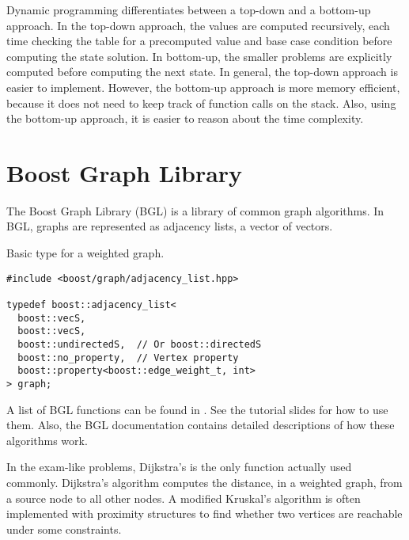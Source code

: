 \documentclass[justified,nobib]{tufte-handout}
\begin{document}

Dynamic programming differentiates between a top-down and a bottom-up approach. In the top-down
approach, the values are computed recursively, each time checking the table for a precomputed value
and base case condition before computing the state solution. In bottom-up, the smaller problems are
explicitly computed before computing the next state. In general, the top-down approach is easier to
implement. However, the bottom-up approach is more memory efficient, because it does not need to
keep track of function calls on the stack. Also, using the bottom-up approach, it is easier to
reason about the time complexity.

\section{Boost Graph Library}

The Boost Graph Library (BGL) is a library of common graph algorithms. In BGL, graphs are
represented as adjacency lists, \ie a vector of vectors.

\begin{listing}
    \caption{Basic type for a weighted graph.}
    \begin{lstlisting}
#include <boost/graph/adjacency_list.hpp>

typedef boost::adjacency_list<
  boost::vecS,
  boost::vecS,
  boost::undirectedS,  // Or boost::directedS
  boost::no_property,  // Vertex property
  boost::property<boost::edge_weight_t, int>
> graph;
  \end{lstlisting}
\end{listing}

A list of BGL functions can be found in . See the tutorial slides for how to
use them. Also, the BGL documentation contains detailed descriptions of how these algorithms work.

In the exam-like problems, Dijkstra's is the only function actually used commonly. Dijkstra's
algorithm computes the distance, in a weighted graph, from a source node to all other nodes. A
modified Kruskal's algorithm is often implemented with proximity structures to find whether two
vertices are reachable under some constraints.
\end{document}
